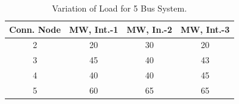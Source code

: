 \documentclass[preprint,12pt,3p]{elsarticle}
\begin{document}
	\begin{table}[ht] 
		
		\caption{Variation of Load for 5 Bus System.} %
		
		\centering %
		
		\begin{tabular}{| c | c | c | c |} %
			
			\hline\hline %
			
			Conn. Node & MW, Int.-1 & MW, In.-2 & MW, Int.-3 \\ [0.5ex] %
			
			
			\hline %
			
			
			2 & 20 & 30 & 20 \\ %
			\hline
			3 & 45 & 40 & 43 \\ [1ex] %
			
			\hline %
			4 & 40 & 40 & 45 \\ [1ex] %
			
			\hline %
			5 & 60 & 65 & 65 \\ [1ex] %
			
			\hline %
		\end{tabular} 
		
		\label{table:5LASCOPFLoad} %
		
	\end{table}
	\fi
\end{document}
